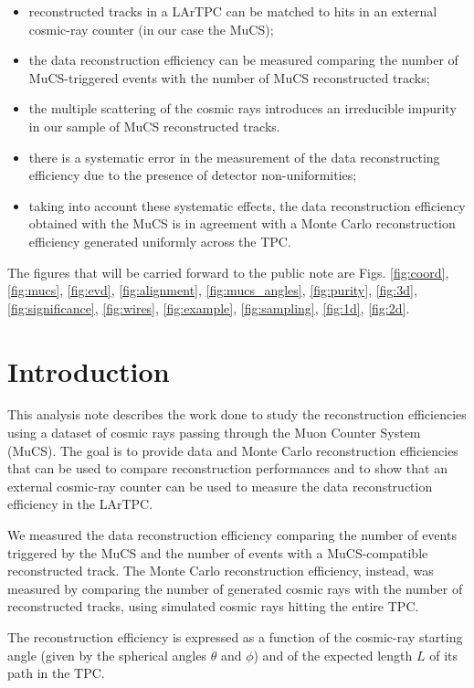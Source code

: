 \documentclass[a4paper]{scrartcl}
\begin{document}
\begin{itemize}
  \item reconstructed tracks in a LArTPC can be matched to hits in an external cosmic-ray counter (in our case the MuCS);
  \item the data reconstruction efficiency can be measured comparing the number of MuCS-triggered events with the number of MuCS reconstructed tracks;
  \item the multiple scattering of the cosmic rays introduces an irreducible impurity in our sample of MuCS reconstructed tracks.
  \item there is a systematic error in the measurement of the data reconstructing efficiency due to the presence of detector non-uniformities;
  \item taking into account these systematic effects, the data reconstruction efficiency obtained with the MuCS is in agreement with a Monte Carlo reconstruction efficiency generated uniformly across the TPC.

\end{itemize}

The figures that will be carried forward to the public note are Figs. \ref{fig:coord}, \ref{fig:mucs}, \ref{fig:evd}, \ref{fig:alignment}, \ref{fig:mucs_angles}, \ref{fig:purity}, \ref{fig:3d}, \ref{fig:significance}, \ref{fig:wires}, \ref{fig:example}, \ref{fig:sampling}, \ref{fig:1d}, \ref{fig:2d}.
\clearpage{}
\section{Introduction}
This analysis note describes the work done to study the reconstruction efficiencies using a dataset of cosmic rays passing through the Muon Counter System (MuCS).
The goal is to provide data and Monte Carlo reconstruction efficiencies that can be used to compare reconstruction performances and to show that an external cosmic-ray counter can be used to measure the data reconstruction efficiency in the LArTPC.

We measured the data reconstruction efficiency comparing the number of events triggered by the MuCS and the number of events with a MuCS-compatible reconstructed track.
The Monte Carlo reconstruction efficiency, instead, was measured by comparing the number of generated cosmic rays with the number of reconstructed tracks, using simulated cosmic rays hitting the entire TPC.

The reconstruction efficiency is expressed as a function of the cosmic-ray starting angle (given by the spherical angles $\theta$ and $\phi$) and of the expected length $L$ of its path in the TPC.%
\end{document}
